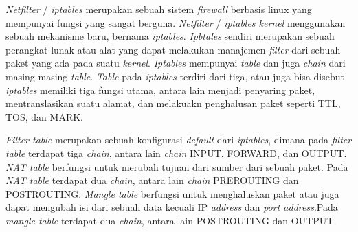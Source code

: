  \textit{Netfilter} / \textit{iptables} merupakan sebuah sistem \textit{firewall} berbasis linux yang mempunyai fungsi yang sangat berguna. \textit{Netfilter} / \textit{iptables kernel} menggunakan sebuah mekanisme baru, bernama \textit{iptables}. \textit{Ipbtales} sendiri merupakan sebuah perangkat lunak atau alat yang dapat melakukan manajemen \textit{filter} dari sebuah paket yang ada pada suatu \textit{kernel}. \textit{Iptables} mempunyai \textit{table} dan juga \textit{chain} dari masing-masing \textit{table}. \textit{Table} pada \textit{iptables} terdiri dari tiga, atau juga bisa disebut \textit{iptables} memiliki tiga fungsi utama, antara lain menjadi penyaring paket, mentranslasikan suatu alamat, dan melakuakn penghalusan paket seperti TTL, TOS, dan MARK.
 
 \textit{Filter table} merupakan sebuah konfigurasi \textit{default} dari \textit{iptables}, dimana pada \textit{filter table} terdapat tiga \textit{chain}, antara lain \textit{chain} INPUT, FORWARD, dan OUTPUT. \textit{NAT table} berfungsi untuk merubah tujuan dari sumber dari sebuah paket. Pada \textit{NAT table} terdapat dua \textit{chain}, antara lain \textit{chain} PREROUTING dan POSTROUTING. \textit{Mangle table} berfungsi untuk menghaluskan paket atau juga dapat mengubah isi dari sebuah data kecuali IP \textit{address} dan \textit{port address}.Pada \textit{mangle table} terdapat dua \textit{chain}, antara lain POSTROUTING dan OUTPUT.
	 
